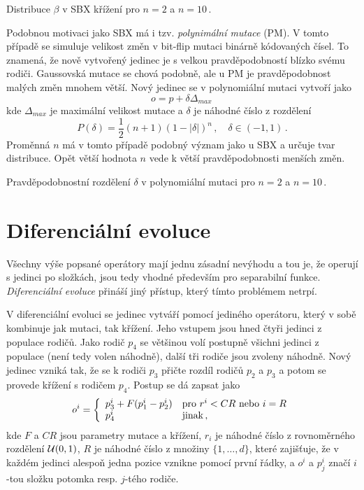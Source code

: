 \begin{marginfigure}[-12\baselineskip]
\centering

\caption{Distribuce $\beta$ v SBX křížení pro $n=2$ a $n=10\,.$}
\label{fig:sbx_beta}
\end{marginfigure}

Podobnou motivaci jako SBX má i tzv. \emph{polynimální mutace} (PM)\cite{Deb96acombined}. V tomto případě se simuluje velikost změn v bit-flip mutaci binárně kódovaných čísel. To znamená, že nově vytvořený jedinec je s velkou pravděpodobností blízko svému rodiči. Gaussovská mutace se chová podobně, ale u PM je pravděpodobnost malých změn mnohem větší. Nový jedinec se v polynomiální mutaci vytvoří jako 
$$o = p + \delta \Delta_{max}\,$$ kde $\Delta_{max}$ je maximální velikost mutace a $\delta$ je náhodné číslo z rozdělení $$P(\delta) = \frac{1}{2}(n+1)(1-|\delta|)^n\,, \quad \delta \in (-1, 1)\,.$$ Proměnná $n$ má v tomto případě podobný význam jako u SBX a určuje tvar distribuce. Opět větší hodnota $n$ vede k větší pravděpodobnosti menších změn.

\begin{marginfigure}[-10\baselineskip]
\centering

\caption{Pravděpodobnostní rozdělení $\delta$ v polynomiální mutaci pro $n=2$ a $n=10\,.$}
\end{marginfigure}

\section{Diferenciální evoluce}

Všechny výše popsané operátory mají jednu zásadní nevýhodu a tou je, že operují s jedinci po složkách, jsou tedy vhodné především pro separabilní funkce. \emph{Diferenciální evoluce}\cite{Storn1997} přináší jiný přístup, který tímto problémem netrpí. 

V diferenciální evoluci se jedinec vytváří pomocí jediného operátoru, který v sobě kombinuje jak mutaci, tak křížení. Jeho vstupem jsou hned čtyři jedinci z populace rodičů. Jako rodič $p_4$ se většinou volí postupně všichni jedinci z populace (není tedy volen náhodně), další tři rodiče jsou zvoleny náhodně. Nový jedinec vzniká tak, že se k rodiči $p_3$ přičte rozdíl rodičů $p_2$ a $p_3$ a potom se provede křížení s rodičem $p_4$. Postup se dá zapsat jako 
$$o^i = \left\{ \begin{array}{ll} p_3^i + F(p_1^i-p_2^i) & \text{pro } r^i < CR \text{ nebo } i = R \\ p_4^i & \text{jinak} \,, \end{array} \right.$$
kde $F$ a $CR$ jsou parametry mutace a křížení, $r_i$ je náhodné číslo z rovnoměrného rozdělení $\mathcal{U}(0, 1)$, $R$ je náhodné číslo z množiny $\{1,\dots,d\}$, které zajišťuje, že v každém jedinci alespoň jedna pozice vznikne pomocí první řádky, a $o^i$ a $p_j^i$ značí $i$-tou složku potomka resp. $j$-tého rodiče.

